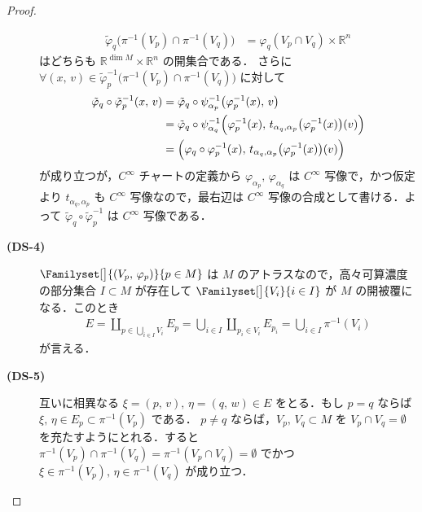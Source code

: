 \documentclass[TQFT_main]{subfiles}
\begin{document}
\begin{proof}
\begin{description}
\begin{align}
            \tilde{\varphi}_{q} \bigl( \pi^{-1}(V_p) \cap \pi^{-1}(V_q) \bigr) &= \varphi_q(V_p \cap V_q) \times \mathbb{R}^n
        \end{align}
        はどちらも $\mathbb{R}^{\dim M} \times \mathbb{R}^n$ の開集合である．
        さらに $\forall (x,\, v) \in \tilde{\varphi}_p^{-1} \bigl( \pi^{-1}(V_p) \cap \pi^{-1}(V_q) \bigr)$ に対して
        \begin{align}
            \tilde{\varphi}_q \circ \tilde{\varphi}_p^{-1} (x,\, v) 
            &= \tilde{\varphi}_q \circ \psi_{\alpha_p}^{-1} \bigl( \varphi_p^{-1}(x),\, v \bigr) \\
            &= \tilde{\varphi}_q \circ \psi_{\alpha_q}^{-1} \Bigl( \varphi_p^{-1}(x),\, t_{\alpha_q,\alpha_p} \bigl( \varphi_p^{-1}(x) \bigr)(v) \Bigr) \\
            &= \Bigl( \varphi_q \circ \varphi_p^{-1}(x),\,  t_{\alpha_q,\alpha_p} \bigl( \varphi_p^{-1}(x) \bigr)(v) \Bigr)
        \end{align}
        が成り立つが，$C^\infty$ チャートの定義から $\varphi_{\alpha_p},\, \varphi_{\alpha_q}$ は $C^\infty$ 写像で，かつ仮定より $t_{\alpha_q,\alpha_p}$ も $C^\infty$ 写像なので，最右辺は $C^\infty$ 写像の合成として書ける．よって $\tilde{\varphi}_q \circ \tilde{\varphi}_p^{-1}$ は $C^\infty$ 写像である．

        \item[\textbf{(DS-4)}] $\Familyset[\big]{(V_p,\, \varphi_p)}{p \in M}$ は $M$ のアトラスなので，高々可算濃度の部分集合 $I \subset M$ が存在して $\Familyset[\big]{V_i}{i \in I}$ が $M$ の開被覆になる．このとき
        \begin{align}
            E = \coprod_{p \in \bigcup_{i \in I} V_i} E_p = \bigcup_{i \in I} \coprod_{p_i \in V_i} E_{p_i} = \bigcup_{i \in I} \pi^{-1} (V_i)
        \end{align}
        が言える．
        \item[\textbf{(DS-5)}] 互いに相異なる $\xi = (p,\, v),\, \eta = (q,\, w) \in E$ をとる．もし $p = q$ ならば $\xi,\, \eta \in E_p \subset \pi^{-1}(V_p)$ である．
        $p \neq q$ ならば，$V_p,\, V_q \subset M$ を $V_p \cap V_q = \emptyset$ を充たすようにとれる．すると $\pi^{-1}(V_p) \cap \pi^{-1}(V_q) = \pi^{-1}(V_p \cap V_q) = \emptyset$ でかつ $\xi \in \pi^{-1}(V_p),\, \eta \in \pi^{-1}(V_q)$ が成り立つ．
    \end{description}
    

\end{proof}
\end{document}

